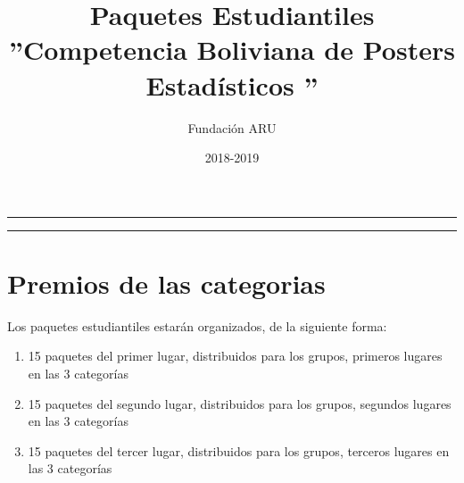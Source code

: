 \documentclass{article}
\title{\textbf{Paquetes Estudiantiles} \\ ''Competencia Boliviana de Posters Estadísticos ''}
\author{Fundación ARU}
\date{2018-2019 }
\begin{document}
\maketitle

\hrule
\hrule
\newpage


\section{Premios de las categorias}

Los paquetes estudiantiles estarán organizados, de la siguiente forma:

\begin{enumerate}
\item 15 paquetes del primer lugar, distribuidos para los grupos, primeros lugares en las 3 categorías
\item 15 paquetes del segundo lugar, distribuidos para los grupos, segundos lugares en las 3 categorías
\item 15 paquetes del tercer lugar, distribuidos para los grupos, terceros lugares en las 3 categorías
\end{enumerate}
\end{document}
